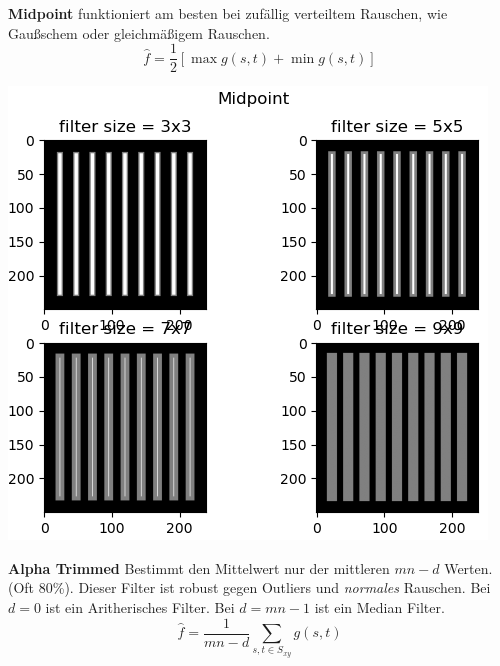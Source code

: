 \textbf{Midpoint} funktioniert am besten bei zufällig verteiltem Rauschen, wie Gaußschem oder gleichmäßigem Rauschen.
\[
\hat{f} = \frac{1}{2}\left[\max g(s,t) + \min g(s,t)\right]
\]
\begin{center}
	\includegraphics[width=0.8\columnwidth]{Images/max1}
\end{center}


\textbf{Alpha Trimmed}
Bestimmt den Mittelwert nur der mittleren $mn-d$ Werten. (Oft 80\%). Dieser Filter ist robust gegen Outliers und \textit{normales} Rauschen. Bei $d=0$ ist ein Aritherisches Filter. Bei $d = mn-1$ ist ein Median Filter.
\[
\hat{f} = \frac{1}{mn -d } \sum_{s,t\in S_{xy}}g(s,t)
\]